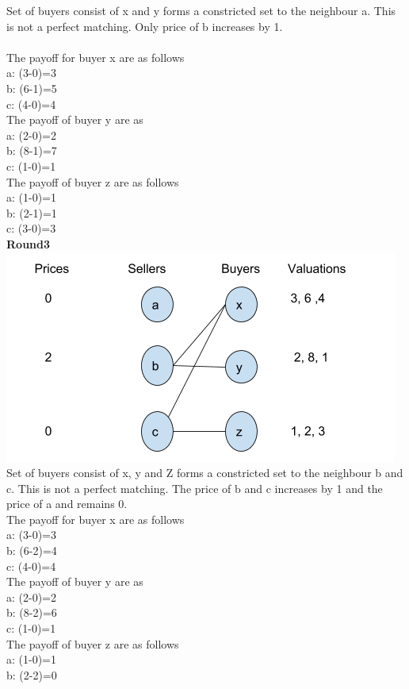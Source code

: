\documentclass[]{article}
\begin{document}
Set of buyers consist of x and y forms a constricted set to the neighbour a. This is not a perfect matching. Only price of b increases by 1.\\\\
The payoff for buyer x are as follows \\
a: (3-0)=3\\
b: (6-1)=5\\
c: (4-0)=4\\
The payoff of buyer y are as \\
a: (2-0)=2\\
b: (8-1)=7\\
c: (1-0)=1\\
The payoff of buyer z are as follows\\
a: (1-0)=1\\
b: (2-1)=1\\
c: (3-0)=3\\
\textbf{Round3}\\
\includegraphics[scale=.5]{9r3.png}\\
Set of buyers consist of x, y and Z  forms a constricted set to the neighbour b and c. This is not a perfect matching. The price of b and c increases by 1 and the price of a and  remains 0.\\
The payoff for buyer x are as follows \\
a: (3-0)=3\\
b: (6-2)=4\\
c: (4-0)=4\\
The payoff of buyer y are as \\
a: (2-0)=2\\
b: (8-2)=6\\
c: (1-0)=1\\
The payoff of buyer z are as follows\\
a: (1-0)=1\\
b: (2-2)=0\\
\end{document}
